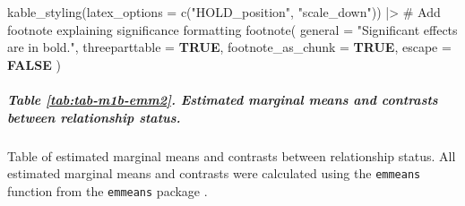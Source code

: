 \documentclass[
  bookmarksnumbered]{article}
\newenvironment{Shaded}{\begin{snugshade}}{\end{snugshade}}
\newcommand{\AttributeTok}[1]{\textcolor[rgb]{0.80,0.80,0.80}{#1}}
\newcommand{\CommentTok}[1]{\textcolor[rgb]{0.50,0.62,0.50}{#1}}
\newcommand{\ConstantTok}[1]{\textcolor[rgb]{0.86,0.64,0.64}{\textbf{#1}}}
\newcommand{\FunctionTok}[1]{\textcolor[rgb]{0.94,0.94,0.56}{#1}}
\newcommand{\NormalTok}[1]{\textcolor[rgb]{0.80,0.80,0.80}{#1}}
\newcommand{\SpecialCharTok}[1]{\textcolor[rgb]{0.86,0.64,0.64}{#1}}
\newcommand{\StringTok}[1]{\textcolor[rgb]{0.80,0.58,0.58}{#1}}
\begin{document}
\begin{Shaded}
\begin{Highlighting}[]
  \FunctionTok{kable\_styling}\NormalTok{(}\AttributeTok{latex\_options =} \FunctionTok{c}\NormalTok{(}\StringTok{"HOLD\_position"}\NormalTok{, }\StringTok{"scale\_down"}\NormalTok{)) }\SpecialCharTok{|\textgreater{}}
  \CommentTok{\# Add footnote explaining significance formatting}
  \FunctionTok{footnote}\NormalTok{(}
    \AttributeTok{general =} \StringTok{"Significant effects are in bold."}\NormalTok{, }\AttributeTok{threeparttable =} \ConstantTok{TRUE}\NormalTok{,}
    \AttributeTok{footnote\_as\_chunk =} \ConstantTok{TRUE}\NormalTok{, }\AttributeTok{escape =} \ConstantTok{FALSE}
\NormalTok{  )}
\end{Highlighting}
\end{Shaded}

\begin{table}[H]
\centering
\caption{\label{tab:tab-m1b-emm1}Estimated marginal means and contrasts between participants' gender}
\centering
{}
\end{table}

\subparagraph{Table \ref{tab:tab-m1b-emm2}. Estimated marginal means and contrasts between relationship status.}\label{table-reftabtab-m1b-emm2.-estimated-marginal-means-and-contrasts-between-relationship-status.}

Table of estimated marginal means and contrasts between relationship status. All estimated marginal means and contrasts were calculated using the \texttt{emmeans} function from the \texttt{emmeans} package \autocite{emmeanscit}.
\end{document}
